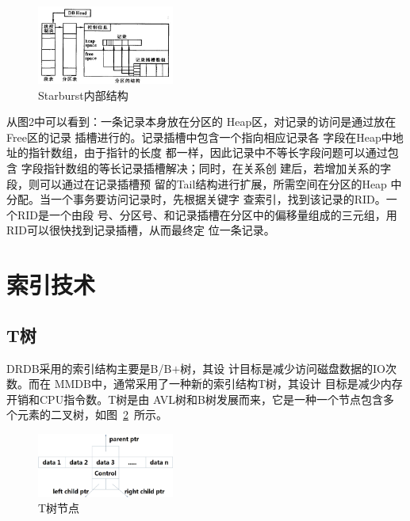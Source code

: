 \documentclass[literaturereview]{zjutreport}
\begin{document}
\begin{figure}[htbp]
\centering
\includegraphics[width=0.4\textwidth]{starburst}
\caption{Starburst内部结构}\label{fig:starburst}
\vspace{\baselineskip}
\end{figure}

从图2中可以看到：一条记录本身放在分区的
Heap区，对记录的访问是通过放在Free区的记录
插槽进行的。记录插槽中包含一个指向相应记录各
字段在Heap中地址的指针数组，由于指针的长度
都一样，因此记录中不等长字段问题可以通过包含
字段指针数组的等长记录插槽解决；同时，在关系创
建后，若增加关系的字段，则可以通过在记录插槽预
留的Tail结构进行扩展，所需空间在分区的Heap
中分配。当一个事务要访问记录时，先根据关键字
查索引，找到该记录的RID。一个RID是一个由段
号、分区号、和记录插槽在分区中的偏移量组成的三元组，用RID可以很快找到记录插槽，从而最终定
位一条记录。

\section{索引技术}
\subsection{T树}
DRDB采用的索引结构主要是B/B$+$树，其设
计目标是减少访问磁盘数据的IO次数。而在
MMDB中，通常采用了一种新的索引结构T树，其设计
目标是减少内存开销和CPU指令数。T树是由
AVL树和B树发展而来，它是一种一个节点包含多
个元素的二叉树，如图~\ref{fig:treenode}~所示。

\begin{figure}[htbp]
\centering
\includegraphics[width=0.4\textwidth]{treenode}
\caption{T树节点}\label{fig:treenode}
\vspace{\baselineskip}
\end{figure}
\end{document}
